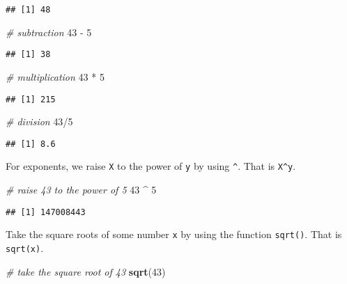 \documentclass[]{book}
\newenvironment{Shaded}{\begin{snugshade}}{\end{snugshade}}
\newcommand{\KeywordTok}[1]{\textcolor[rgb]{0.13,0.29,0.53}{\textbf{{#1}}}}
\newcommand{\DecValTok}[1]{\textcolor[rgb]{0.00,0.00,0.81}{{#1}}}
\newcommand{\StringTok}[1]{\textcolor[rgb]{0.31,0.60,0.02}{{#1}}}
\newcommand{\CommentTok}[1]{\textcolor[rgb]{0.56,0.35,0.01}{\textit{{#1}}}}
\newcommand{\NormalTok}[1]{{#1}}
\begin{document}
\begin{verbatim}
## [1] 48
\end{verbatim}

\begin{Shaded}
\begin{Highlighting}[]
\CommentTok{# subtraction}
\DecValTok{43} \NormalTok{-}\StringTok{ }\DecValTok{5}
\end{Highlighting}
\end{Shaded}

\begin{verbatim}
## [1] 38
\end{verbatim}

\begin{Shaded}
\begin{Highlighting}[]
\CommentTok{# multiplication}
\DecValTok{43} \NormalTok{*}\StringTok{ }\DecValTok{5}
\end{Highlighting}
\end{Shaded}

\begin{verbatim}
## [1] 215
\end{verbatim}

\begin{Shaded}
\begin{Highlighting}[]
\CommentTok{# division}
\DecValTok{43}\NormalTok{/}\DecValTok{5}
\end{Highlighting}
\end{Shaded}

\begin{verbatim}
## [1] 8.6
\end{verbatim}

For exponents, we raise \texttt{X} to the power of \texttt{y} by using
\texttt{\^{}}. That is \texttt{X\^{}y}.

\begin{Shaded}
\begin{Highlighting}[]
\CommentTok{# raise 43 to the power of 5}
\DecValTok{43} \NormalTok{^}\StringTok{ }\DecValTok{5}
\end{Highlighting}
\end{Shaded}

\begin{verbatim}
## [1] 147008443
\end{verbatim}

Take the square roots of some number \texttt{x} by using the function
\texttt{sqrt()}. That is \texttt{sqrt(x)}.

\begin{Shaded}
\begin{Highlighting}[]
\CommentTok{# take the square root of 43}
\KeywordTok{sqrt}\NormalTok{(}\DecValTok{43}\NormalTok{)}
\end{Highlighting}
\end{Shaded}
\end{document}
